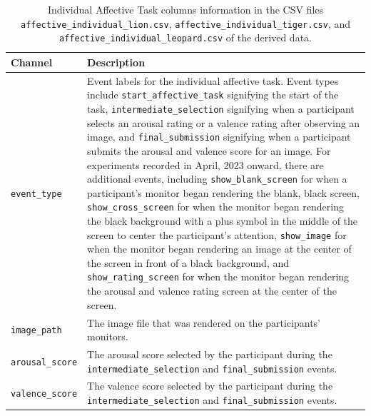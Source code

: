 
\begin{table}
\centering
\begin{tabularx}{\textwidth}{lX}
    \toprule
    Channel & Description \\\midrule
    \texttt{event\_type} & Event labels for the individual affective task. Event types include \texttt{start\_affective\_task} signifying the start of the task, \texttt{intermediate\_selection} signifying when a participant selects an arousal rating or a valence rating after observing an image, and \texttt{final\_submission} signifying when a participant submits the arousal and valence score for an image. For experiments recorded in April, 2023 onward, there are additional events, including \texttt{show\_blank\_screen} for when a participant's monitor began rendering the blank, black screen, \texttt{show\_cross\_screen} for when the monitor began rendering the black background with a plus symbol in the middle of the screen to center the participant's attention, \texttt{show\_image} for when the monitor began rendering an image at the center of the screen in front of a black background, and \texttt{show\_rating\_screen} for when the monitor began rendering the arousal and valence rating screen at the center of the screen.\\
    \texttt{image\_path} & The image file that was rendered on the participants' monitors.\\
    \texttt{arousal\_score} & The arousal score selected by the participant during the \texttt{intermediate\_selection} and \texttt{final\_submission} events.\\
    \texttt{valence\_score} & The valence score selected by the participant during the \texttt{intermediate\_selection} and \texttt{final\_submission} events.\\
\bottomrule
\end{tabularx}
\caption{Individual Affective Task columns information in the CSV files \texttt{affective\_individual\_lion.csv}, \texttt{affective\_individual\_tiger.csv}, and \texttt{affective\_individual\_leopard.csv} of the derived data.}
\label{tab:individual_affective_task_columns}
\end{table}


